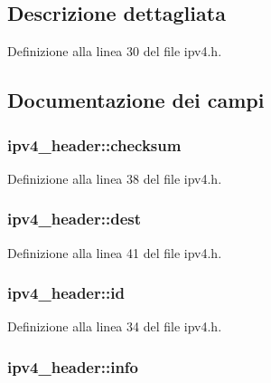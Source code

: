 \subsection{Descrizione dettagliata}


Definizione alla linea 30 del file ipv4.\+h.



\subsection{Documentazione dei campi}
\hypertarget{structipv4__header_ac6447b538451342a6f016aedd17eb9fa}{
\subsubsection[{checksum}]{ ipv4\+\_\+header\+::checksum}}\label{structipv4__header_ac6447b538451342a6f016aedd17eb9fa}


Definizione alla linea 38 del file ipv4.\+h.

\hypertarget{structipv4__header_ad678f7696656cd04188dd3442294a793}{
\subsubsection[{dest}]{ ipv4\+\_\+header\+::dest}}\label{structipv4__header_ad678f7696656cd04188dd3442294a793}


Definizione alla linea 41 del file ipv4.\+h.

\hypertarget{structipv4__header_a1b3ce4e0d6313af76d19bace542513a3}{
\subsubsection[{id}]{ ipv4\+\_\+header\+::id}}\label{structipv4__header_a1b3ce4e0d6313af76d19bace542513a3}


Definizione alla linea 34 del file ipv4.\+h.

\hypertarget{structipv4__header_a40af269fc2efcdd3a4b85b550a376023}{
\subsubsection[{info}]{ ipv4\+\_\+header\+::info}}\label{structipv4__header_a40af269fc2efcdd3a4b85b550a376023}


